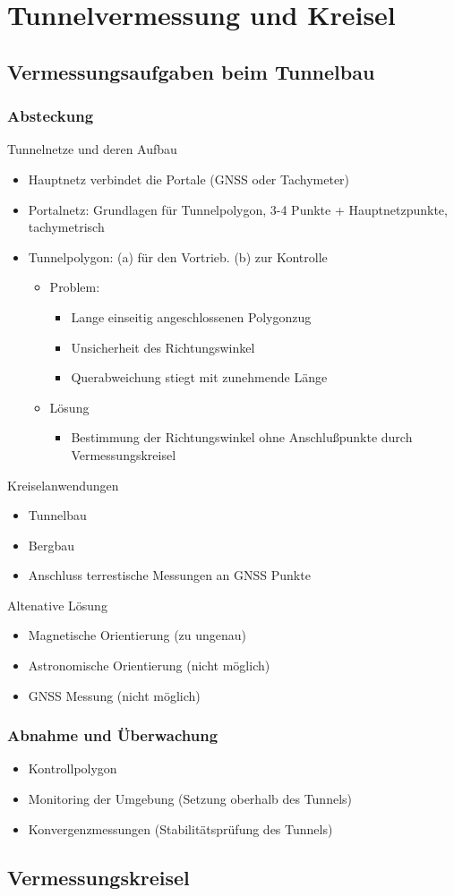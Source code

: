\documentclass[12pt]{article}
\begin{document}
	\pagestyle{main}
\tableofcontents
\newpage
\section{Tunnelvermessung und Kreisel}	
\subsection{Vermessungsaufgaben beim Tunnelbau}
\subsubsection{Absteckung}
Tunnelnetze und deren Aufbau
\begin{itemize}
\item Hauptnetz verbindet die Portale (GNSS oder Tachymeter)
\item Portalnetz: Grundlagen für Tunnelpolygon, 3-4 Punkte + Hauptnetzpunkte, tachymetrisch
\item Tunnelpolygon: (a) für den Vortrieb. (b) zur Kontrolle 
	\begin{itemize}
		\item Problem: 
		\begin{itemize}
			\item Lange einseitig angeschlossenen Polygonzug
			\item Unsicherheit des Richtungswinkel
			\item Querabweichung stiegt mit zunehmende Länge
		\end{itemize}
		\item Lösung
		\begin{itemize}
			\item Bestimmung der Richtungswinkel ohne Anschlußpunkte durch Vermessungskreisel
		\end{itemize}
	\end{itemize}
\end{itemize}
Kreiselanwendungen
\begin{itemize}
	\item Tunnelbau
	\item Bergbau
	\item Anschluss terrestische Messungen an GNSS Punkte
\end{itemize}
Altenative Lösung
\begin{itemize}
	\item Magnetische Orientierung (zu ungenau)
	\item Astronomische Orientierung (nicht möglich)
	\item GNSS Messung (nicht möglich)
\end{itemize}
\subsubsection{Abnahme und Überwachung}
\begin{itemize}
	\item Kontrollpolygon
	\item Monitoring der Umgebung (Setzung oberhalb des Tunnels)
	\item Konvergenzmessungen (Stabilitätsprüfung des Tunnels)
\end{itemize}
\subsection{Vermessungskreisel}
\end{document}
